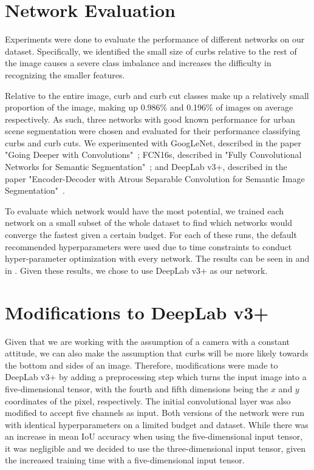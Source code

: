 \section{Network Evaluation}\label{section:experiments-networkevaluation}
Experiments were done to evaluate the performance of different networks on our dataset.
Specifically, we identified the small size of curbs relative to the rest of the image causes a severe class imbalance and increases the difficulty in recognizing the smaller features.

Relative to the entire image, curb and curb cut classes make up a relatively small proportion of the image, making up 0.986\% and 0.196\% of images on average respectively.
As such, three networks with good known performance for urban scene segmentation were chosen and evaluated for their performance classifying curbs and curb cuts.
We experimented with GoogLeNet, described in the paper "Going Deeper with Convolutions"~\cite{googlenet}; FCN16s, described in "Fully Convolutional Networks for Semantic Segmentation"~\cite{fcn}; and DeepLab v3+, described in the paper "Encoder-Decoder with Atrous Separable Convolution for Semantic Image Segmentation"~\cite{deeplab}.

To evaluate which network would have the most potential, we trained each network on a small subset of the whole dataset to find which networks would converge the fastest given a certain budget.
For each of these runs, the default recommended hyperparameters were used due to time constraints to conduct hyper-parameter optimization with every network.
The results can be seen in  and in .
Given these results, we chose to use DeepLab v3+ as our network.




\section{Modifications to DeepLab v3+}\label{section:experiments-modifications}
Given that we are working with the assumption of a camera with a constant attitude, we can also make the assumption that curbs will be more likely towards the bottom and sides of an image.
Therefore, modifications were made to DeepLab v3+ by adding a preprocessing step which turns the input image into a five-dimensional tensor, with the fourth and fifth dimensions being the $x$ and $y$ coordinates of the pixel, respectively.
The initial convolutional layer was also modified to accept five channels as input.
Both versions of the network were run with identical hyperparameters on a limited budget and dataset.
While there was an increase in mean IoU accuracy when using the five-dimensional input tensor, it was negligible and we decided to use the three-dimensional input tensor, given the increased training time with a five-dimensional input tensor.

